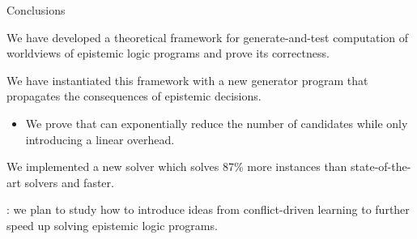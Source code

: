 \documentclass[aspectratio=169,svgnames,xcolor=table,t]{beamer}
\begin{document}
            
\begin{frame}{Conclusions}
    \begin{myitemize}
        \item We have developed a theoretical framework for generate-and-test computation of worldviews of epistemic logic programs and prove its correctness.
        
        \item We have instantiated this framework with a new generator program that propagates the consequences of epistemic decisions.
        \begin{itemize}
            \item We prove that can exponentially reduce the number of candidates while only introducing a linear overhead. 
        \end{itemize}

        \item We implemented a new solver which solves 87\% more instances than state-of-the-art solvers and  faster.
        
        \bigskip
        
        \item {}: we plan to study how to introduce ideas from conflict-driven learning to further speed up solving epistemic logic programs.
    \end{myitemize}
\end{frame}
\frame{\backcoverpage}
\end{document}
